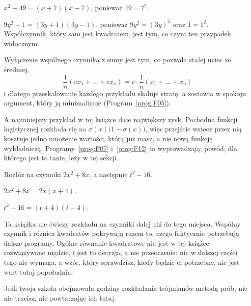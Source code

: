 \begin{fr}
\begin{ansblock}
$x^{2} - 49 = (x + 7)(x - 7)$, ponieważ $49 = 7^{2}$.

$9y^{2} - 1 = (3y + 1)(3y - 1)$, ponieważ $9y^{2} = (3y)^{2}$ oraz
$1 = 1^{2}$. Współczynnik, który sam jest kwadratem, jest tym, co czyni ten
przypadek widocznym.
\end{ansblock}

\begin{aibox}
Wyłączenie wspólnego czynnika z sumy jest tym, co pozwala stałej uciec ze
średniej,
\[ \frac{1}{n}(cx_{1} + \dots + cx_{n})
   = c \cdot \frac{1}{n}(x_{1} + \dots + x_{n}) \]
i dlatego przeskalowanie każdego przykładu skaluje stratę, a zostawia w spokoju
argument, który ją minimalizuje (Program~\ref{prog:F05}).

A najmniejszy przykład w tej książce daje największy zysk. Pochodna funkcji
logistycznej rozkłada się na $\sigma(x)\bigl(1 - \sigma(x)\bigr)$, więc przejście
wstecz przez nią kosztuje jedno mnożenie wartości, którą już masz, a nie nową
funkcję wykładniczą. Programy~\ref{prog:F07} i~\ref{prog:F12} to wyprowadzają;
powód, dla którego jest to tanie, leży w tej sekcji.
\end{aibox}

\yourturn
Rozłóż na czynniki $2x^{2} + 8x$, a następnie $t^{2} - 16$.
\dotline
\nextframe
\end{fr}

\begin{fr}
\begin{ansblock}
$2x^{2} + 8x = 2x(x + 4)$.

$t^{2} - 16 = (t + 4)(t - 4)$.
\end{ansblock}

\begin{note}
Ta książka nie ćwiczy rozkładu na czynniki dalej niż do tego miejsca. Wspólny
czynnik i różnica kwadratów pokrywają razem to, czego faktycznie potrzebują
dalsze programy. Ogólne równanie kwadratowe nie jest w tej książce rozwiązywane
nigdzie, i jest to decyzja, a nie przeoczenie: nic w dalszej części tego nie
wymaga, a wzór, który sprawdzisz, kiedy będzie ci potrzebny, nie jest wart
tutaj popołudnia.

Jeśli twoja szkoła obejmowała godziny rozkładania trójmianów metodą prób, nic
nie tracisz, nie powtarzając ich tutaj.
\end{note}
\end{fr}

